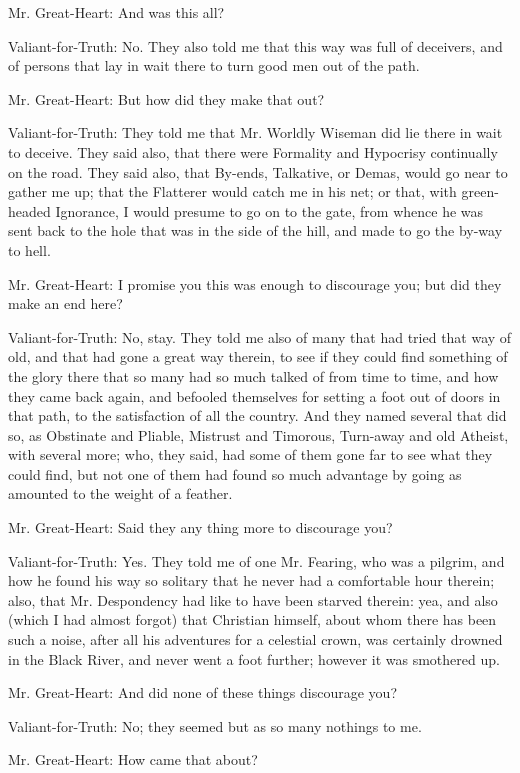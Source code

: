 Mr. Great-Heart: And was this all?

Valiant-for-Truth: No. They also told me that this way was full of deceivers, and of persons that lay in wait there to turn good men out of the path.

Mr. Great-Heart: But how did they make that out?

Valiant-for-Truth: They told me that Mr. Worldly Wiseman did lie there in wait to deceive. They said also, that there were Formality and Hypocrisy continually on the road. They said also, that By-ends, Talkative, or Demas, would go near to gather me up; that the Flatterer would catch me in his net; or that, with green-headed Ignorance, I would presume to go on to the gate, from whence he was sent back to the hole that was in the side of the hill, and made to go the by-way to hell.

Mr. Great-Heart: I promise you this was enough to discourage you; but did they make an end here?

Valiant-for-Truth: No, stay. They told me also of many that had tried that way of old, and that had gone a great way therein, to see if they could find something of the glory there that so many had so much talked of from time to time, and how they came back again, and befooled themselves for setting a foot out of doors in that path, to the satisfaction of all the country. And they named several that did so, as Obstinate and Pliable, Mistrust and Timorous, Turn-away and old Atheist, with several more; who, they said, had some of them gone far to see what they could find, but not one of them had found so much advantage by going as amounted to the weight of a feather.

Mr. Great-Heart: Said they any thing more to discourage you?

Valiant-for-Truth: Yes. They told me of one Mr. Fearing, who was a pilgrim, and how he found his way so solitary that he never had a comfortable hour therein; also, that Mr. Despondency had like to have been starved therein: yea, and also (which I had almost forgot) that Christian himself, about whom there has been such a noise, after all his adventures for a celestial crown, was certainly drowned in the Black River, and never went a foot further; however it was smothered up.

Mr. Great-Heart: And did none of these things discourage you?

Valiant-for-Truth: No; they seemed but as so many nothings to me.

Mr. Great-Heart: How came that about?

